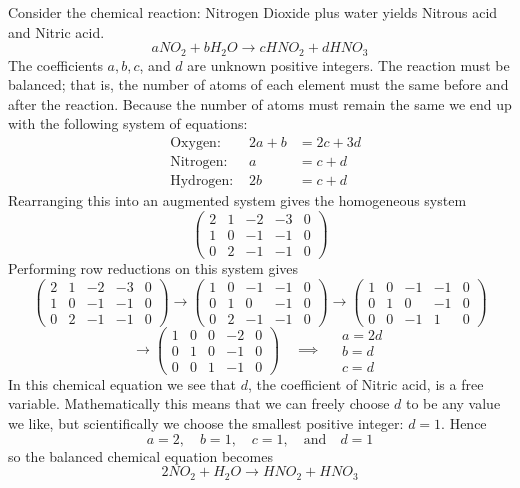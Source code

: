 Consider the chemical reaction: Nitrogen Dioxide plus water yields Nitrous acid and Nitric
acid.
\[ aNO_2 + b H_2O \to c HNO_2 + d HNO_3 \]
The coefficients $a,b,c$, and $d$ are unknown positive integers.  The reaction must be
balanced; that is, the number of atoms of each element must the same before and after the
reaction.  Because the number of atoms must remain the same we end up with the following
system of equations:
\begin{align*}
    &\text{Oxygen: } &  2a + b &= 2c + 3d \\
    &\text{Nitrogen: }  & a &= c + d \\
    &\text{Hydrogen: }  & 2b &= c + d
\end{align*}
Rearranging this into an augmented system gives the homogeneous system
\[ \left( \begin{array}{cccc|c} 2 & 1 & -2 & -3 & 0 \\
                                1 & 0 & -1 & -1 & 0 \\
                                0 & 2 & -1 & -1 & 0 \end{array} \right) \]
Performing row reductions on this system gives
\[ \left( \begin{array}{cccc|c} 2 & 1 & -2 & -3 & 0 \\
                                1 & 0 & -1 & -1 & 0 \\
                                0 & 2 & -1 & -1 & 0 \end{array} \right) 
    \to
   \left( \begin{array}{cccc|c} 1 & 0 & -1 & -1 & 0 \\
                          0 & 1 & 0 & -1 & 0 \\
                          0 & 2 & -1 & -1 & 0 \end{array} \right)
    \to
   \left( \begin{array}{cccc|c} 1 & 0 & -1 & -1 & 0 \\
                          0 & 1 & 0 & -1 & 0 \\
                          0 & 0 & -1 & 1 & 0 \end{array} \right)
                                \]
\[ \to 
   \left( \begin{array}{cccc|c} 1 & 0 & 0 & -2 & 0 \\
                          0 & 1 & 0 & -1 & 0 \\
                          0 & 0 & 1 & -1 & 0 \end{array} \right)
    \quad \implies \quad \begin{array}{l} a=2d \\ b=d \\ c=d \end{array}
                                \]
In this chemical equation we see that $d$, the coefficient of Nitric acid, is a free
variable.  Mathematically this means that we can freely choose $d$ to be any value we
like, but scientifically we choose the smallest positive integer: $d=1$.  Hence
\[ a=2, \quad b=1, \quad c=1, \quad \text{and} \quad d=1 \]
so the balanced chemical equation becomes
\[ 2NO_2 + H_2O \to HNO_2 + HNO_3 \]

